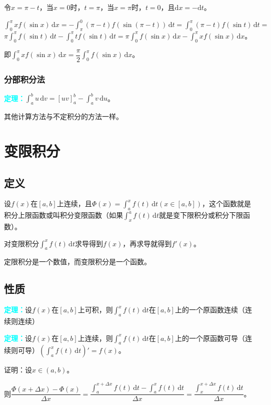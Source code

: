 \documentclass[UTF8, 12pt]{ctexart}
\begin{document}
令$x=\pi-t$，当$x=0$时，$t=\pi$，当$x=\pi$时，$t=0$，且$\textrm{d}x=-\textrm{d}t$。

$\int_0^\pi xf(\sin x)\,\textrm{d}x=-\int_\pi^0(\pi-t)f(\sin(\pi-t))\,\textrm{d}t=\int_0^\pi(\pi-t)f(\sin t)\,\textrm{d}t=$\\$\pi\int_0^\pi f(\sin t)\,\textrm{d}t-\int_0^\pi tf(\sin t)\,\textrm{d}t=\pi\int_0^\pi f(\sin x)\,\textrm{d}x-\int_0^\pi xf(\sin x)\,\textrm{d}x$。

即$\int_0^\pi xf(\sin x)\,\textrm{d}x=\dfrac{\pi}{2}\int_0^\pi f(\sin x)\,\textrm{d}x$。

\subsubsection{分部积分法}

\textcolor{aqua}{\textbf{定理：}}$\int_a^bu\,\textrm{d}v=[uv]_a^b-\int_a^bv\,\textrm{d}u$。

其他计算方法与不定积分的方法一样。

\section{变限积分}

\subsection{定义}

设$f(x)$在$[a,b]$上连续，且$\Phi(x)=\int_a^xf(t)\,\textrm{d}t(x\in[a,b])$，这个函数就是积分上限函数或叫积分变限函数（如果$\int_x^af(t)\,\textrm{d}t$就是变下限积分或积分下限函数）。

对变限积分$\int_{a}^xf(t)\,\textrm{d}t$求导得到$f(x)$，再求导就得到$f'(x)$。

定限积分是一个数值，而变限积分是一个函数。

\subsection{性质}

\textcolor{aqua}{\textbf{定理：}}设$f(x)$在$[a,b]$上可积，则$\int_a^xf(t)\,\textrm{d}t$在$[a,b]$上的一个原函数连续（连续则连续）

\textcolor{aqua}{\textbf{定理：}}设$f(x)$在$[a,b]$上连续，则$\int_a^xf(t)\,\textrm{d}t$在$[a,b]$上的一个原函数可导（连续则可导）$(\int_a^xf(t)\,\textrm{d}t)'=f(x)$。

证明：设$x\in(a,b)$。

则$\dfrac{\Phi(x+\Delta x)-\Phi(x)}{\Delta x}=\dfrac{\int_a^{x+\Delta x}f(t)\,\textrm{d}t-\int_a^xf(t)\,\textrm{d}t}{\Delta x}=\dfrac{\int_x^{x+\Delta x}f(t)\,\textrm{d}t}{\Delta x}$。
\end{document}
